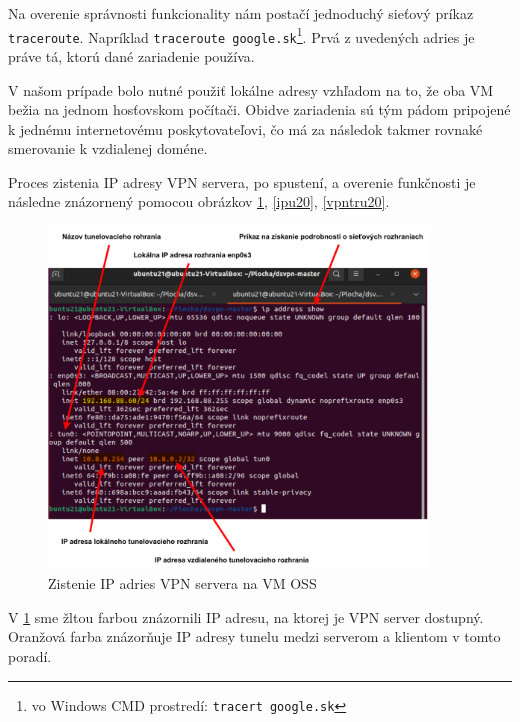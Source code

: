 Na overenie správnosti funkcionality nám postačí jednoduchý sieťový príkaz \lstinline|traceroute|. Napríklad \lstinline|traceroute google.sk|\footnote{vo Windows CMD prostredí: \lstinline|tracert google.sk|}. Prvá z uvedených adries je práve tá, ktorú dané zariadenie používa. 

V našom prípade bolo nutné použiť lokálne adresy vzhľadom na to, že oba VM bežia na jednom hosťovskom počítači. Obidve zariadenia sú tým pádom pripojené k jednému internetovému poskytovateľovi, čo má za následok takmer rovnaké smerovanie k vzdialenej doméne. 

Proces zistenia IP adresy VPN servera, po spustení, a overenie funkčnosti je následne znázornený pomocou obrázkov \ref{ipu21}, \ref{ipu20}, \ref{vpntru20}.

\begin{figure}[!h]
	\centering
	\includegraphics[width=0.9\textwidth]{figures/ipu21}
	\caption{Zistenie IP adries VPN servera na VM OSS}
	\label{ipu21}
\end{figure}
V  \ref{ipu21} sme žltou farbou znázornili IP adresu, na ktorej je VPN server dostupný. Oranžová farba znázorňuje IP adresy tunelu medzi serverom a klientom v tomto poradí. 

